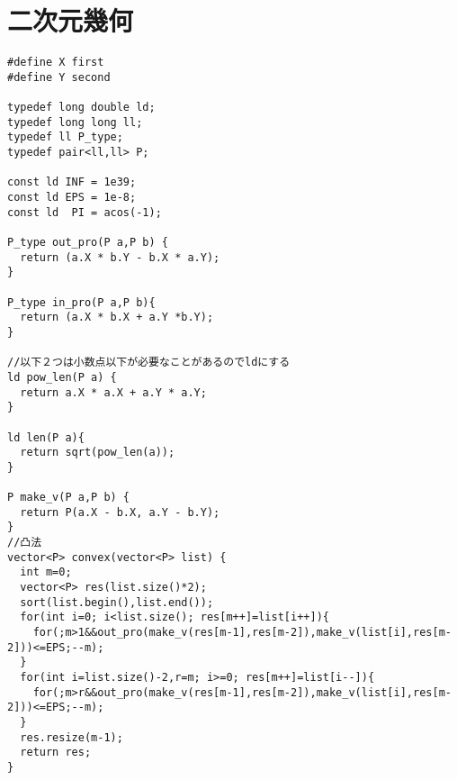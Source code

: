 \documentclass{jsarticle}
\begin{document}
\section{二次元幾何}
\begin{lstlisting}
#define X first
#define Y second

typedef long double ld;
typedef long long ll;
typedef ll P_type;
typedef pair<ll,ll> P;

const ld INF = 1e39;
const ld EPS = 1e-8;
const ld  PI = acos(-1);

P_type out_pro(P a,P b) {
  return (a.X * b.Y - b.X * a.Y);
}

P_type in_pro(P a,P b){
  return (a.X * b.X + a.Y *b.Y);
}

//以下２つは小数点以下が必要なことがあるのでldにする
ld pow_len(P a) {
  return a.X * a.X + a.Y * a.Y;
}

ld len(P a){
  return sqrt(pow_len(a));
}

P make_v(P a,P b) {
  return P(a.X - b.X, a.Y - b.Y);
}
//凸法
vector<P> convex(vector<P> list) {
  int m=0;
  vector<P> res(list.size()*2);
  sort(list.begin(),list.end());
  for(int i=0; i<list.size(); res[m++]=list[i++]){
    for(;m>1&&out_pro(make_v(res[m-1],res[m-2]),make_v(list[i],res[m-2]))<=EPS;--m);
  }
  for(int i=list.size()-2,r=m; i>=0; res[m++]=list[i--]){
    for(;m>r&&out_pro(make_v(res[m-1],res[m-2]),make_v(list[i],res[m-2]))<=EPS;--m);
  }
  res.resize(m-1);
  return res;
}
\end{lstlisting}
\end{document}
